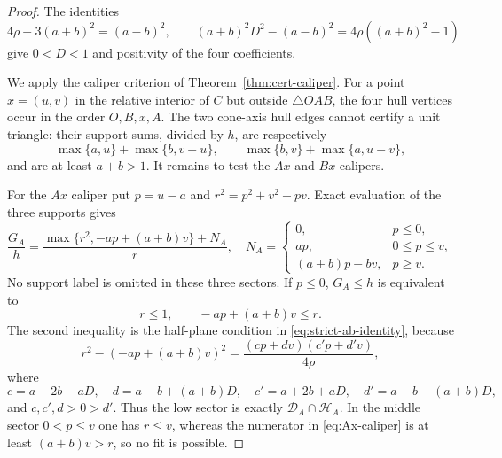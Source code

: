 \begin{proof}
The identities
\[
 4\rho-3(a+b)^2=(a-b)^2,
 \qquad
 (a+b)^2D^2-(a-b)^2=4\rho((a+b)^2-1)
\]
give $0<D<1$ and positivity of the four coefficients.

We apply the caliper criterion of Theorem~\ref{thm:cert-caliper}.  For a
point $x=(u,v)$ in the relative interior of $C$ but outside
$\triangle OAB$, the four hull vertices occur in the order $O,B,x,A$.
The two cone-axis hull edges cannot certify a unit triangle: their support
sums, divided by $h$, are respectively
\[
 \max\{a,u\}+\max\{b,v-u\},\qquad
 \max\{b,v\}+\max\{a,u-v\},
\]
and are at least $a+b>1$.  It remains to test the $Ax$ and $Bx$ calipers.

For the $Ax$ caliper put $p=u-a$ and
$r^2=p^2+v^2-pv$.  Exact evaluation of the three supports gives
\begin{equation}
 \frac{G_A}{h}=
 \frac{\max\{r^2,-ap+(a+b)v\}+N_A}{r},
 \quad
 N_A=\begin{cases}
 0,&p\le0,\\
 ap,&0\le p\le v,\\
 (a+b)p-bv,&p\ge v.
 \end{cases}                                      \label{eq:Ax-caliper}
\end{equation}
No support label is omitted in these three sectors.  If $p\le0$,
$G_A\le h$ is equivalent to
\[
 r\le1,\qquad -ap+(a+b)v\le r.
\]
The second inequality is the half-plane condition in
\eqref{eq:strict-ab-identity}, because
\[
 r^2-(-ap+(a+b)v)^2
 =\frac{(cp+dv)(c'p+d'v)}{4\rho},
\]
where
\[
 c=a+2b-aD,\quad d=a-b+(a+b)D,
 \quad c'=a+2b+aD,\quad d'=a-b-(a+b)D,
\]
and $c,c',d>0>d'$.  Thus the low sector is exactly
$\mathcal D_A\cap\mathcal H_A$.  In the middle sector $0<p\le v$ one has
$r\le v$, whereas the numerator in \eqref{eq:Ax-caliper} is at least
$(a+b)v>r$, so no fit is possible.


\end{proof}
